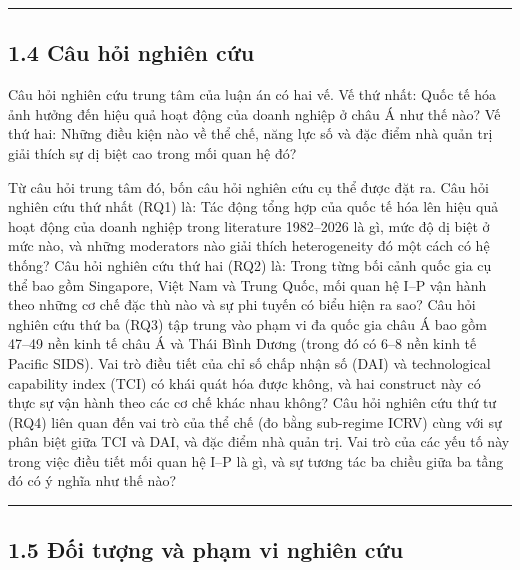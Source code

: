 \documentclass[12pt,a4paper]{article}
\begin{document}
\begin{center}\rule{0.5\linewidth}{0.5pt}\end{center}

\hypertarget{14-cuxe2u-hux1ecfi-nghiuxean-cux1ee9u}{%
\subsection{1.4 Câu hỏi nghiên
cứu}\label{14-cuxe2u-hux1ecfi-nghiuxean-cux1ee9u}}

Câu hỏi nghiên cứu trung tâm của luận án có hai vế. Vế thứ nhất: Quốc tế
hóa ảnh hưởng đến hiệu quả hoạt động của doanh nghiệp ở châu Á như thế
nào? Vế thứ hai: Những điều kiện nào về thể chế, năng lực số và đặc điểm
nhà quản trị giải thích sự dị biệt cao trong mối quan hệ đó?

Từ câu hỏi trung tâm đó, bốn câu hỏi nghiên cứu cụ thể được đặt ra. Câu
hỏi nghiên cứu thứ nhất (RQ1) là: Tác động tổng hợp của quốc tế hóa lên
hiệu quả hoạt động của doanh nghiệp trong literature 1982--2026 là gì,
mức độ dị biệt ở mức nào, và những moderators nào giải thích
heterogeneity đó một cách có hệ thống? Câu hỏi nghiên cứu thứ hai (RQ2)
là: Trong từng bối cảnh quốc gia cụ thể bao gồm Singapore, Việt Nam và
Trung Quốc, mối quan hệ I--P vận hành theo những cơ chế đặc thù nào và
sự phi tuyến có biểu hiện ra sao? Câu hỏi nghiên cứu thứ ba (RQ3) tập
trung vào phạm vi đa quốc gia châu Á bao gồm 47--49 nền kinh tế châu Á
và Thái Bình Dương (trong đó có 6--8 nền kinh tế Pacific SIDS). Vai trò
điều tiết của chỉ số chấp nhận số (DAI) và technological capability
index (TCI) có khái quát hóa được không, và hai construct này có thực sự
vận hành theo các cơ chế khác nhau không? Câu hỏi nghiên cứu thứ tư
(RQ4) liên quan đến vai trò của thể chế (đo bằng sub-regime ICRV) cùng
với sự phân biệt giữa TCI và DAI, và đặc điểm nhà quản trị. Vai trò của
các yếu tố này trong việc điều tiết mối quan hệ I--P là gì, và sự tương
tác ba chiều giữa ba tầng đó có ý nghĩa như thế nào?

\begin{center}\rule{0.5\linewidth}{0.5pt}\end{center}

\hypertarget{15-ux111ux1ed1i-tux1b0ux1ee3ng-vuxe0-phux1ea1m-vi-nghiuxean-cux1ee9u}{%
\subsection{1.5 Đối tượng và phạm vi nghiên
cứu}\label{15-ux111ux1ed1i-tux1b0ux1ee3ng-vuxe0-phux1ea1m-vi-nghiuxean-cux1ee9u}}
\end{document}
